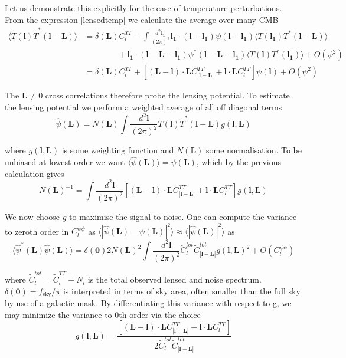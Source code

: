 \documentclass[a4paper,10pt]{article}
\renewcommand{\v}[1]{\mathbf{#1}}
\newcommand{\finttwo}[1]{\int \frac{d^2 \v{#1}}{(2\pi)^2}}
\begin{document}
Let us demonstrate this explicitly for the case of temperature perturbations. From the expression \ref{lensedtemp} we calculate the average over many CMB
\begin{equation}\begin{split}
\langle \tilde{T}(\v{l})\tilde{T}^*(\v{l}-\v{L})\rangle &= \delta(\v{L})C_l^{TT} -  \finttwo{l_1}  \v{l_1}\cdot(\v{l}-\v{l_1})\psi(\v{l}-\v{l_1}) \langle T(\v{l_1})T^*(\v{l}-\v{L})\rangle \\
&\qquad\qquad + \v{l_1}\cdot(\v{l}-\v{L}-\v{l_1})\psi^*(\v{l}-\v{L}-\v{l_1}) \langle T(\v{l})T^*(\v{l_1})\rangle + O(\psi^2) \\
&=\delta(\v{L})C_l^{TT} + [(\v{L}-\v{l})\cdot\v{L}C^{TT}_{|\v{l}-\v{L}|}+\v{l}\cdot\v{L}C_l^{TT}]\psi(\v{l}) + O(\psi^2)
\end{split}\end{equation}

The $\v{L}\neq 0 $ cross correlations therefore probe the lensing potential. To estimate the lensing potential we perform a weighted average of all off diagonal terms
\begin{equation}
\hat{\psi}(\v{L}) = N(\v{L})\finttwo{l} \tilde{T}(\v{l})\tilde{T}^*(\v{l-L})g(\v{l},\v{L})
\end{equation}

where $g(\v{l},\v{L})$ is some weighting function and $N(\v{L})$ some normalisation. To be unbiased at lowest order we want $\langle \hat{\psi}(\v{L}) \rangle = \psi(\v{L})$, which by the previous calculation gives
\begin{equation}
N(\v{L})^{-1} = \finttwo{l} [(\v{L}-\v{l})\cdot\v{L}C^{TT}_{|\v{l}-\v{L}|}+\v{l}\cdot\v{L}C_l^{TT}]g(\v{l},\v{L})
\end{equation}

We now choose $g$ to maximise the signal to noise. One can compute the variance to zeroth order in $C_l^{\psi\psi}$ as $\langle| \hat{\psi}(\v{L})-\psi(\v{L})|^2 \rangle \approx 
\langle| \hat{\psi}(\v{L})|^2 \rangle$ as
\begin{equation}
\langle\hat{\psi}^*(\v{L}) \hat{\psi}(\v{L}) \rangle = \delta(\v{0})2N(\v{L})^2\finttwo{l}\tilde{C}_l^{tot}\tilde{C}_{|\v{l}-\v{L}|}^{tot}g(\v{l},\v{L})^2 + O(C_l^{\psi\psi})
\end{equation}

where $\tilde{C}_l^{tot} = \tilde{C}_l^{TT} + N_l$ is the total observed lensed and noise spectrum. $\delta(\v{0}) = f_{\text{sky}}/\pi$ is interpreted in terms of sky area, often smaller than the full sky by use of a galactic mask. By differentiating this variance with respect to g, we may minimize the variance to 0th order via the choice
\begin{equation}
g(\v{l},\v{L}) = \frac{[(\v{L}-\v{l})\cdot\v{L}C^{TT}_{|\v{l}-\v{L}|}+\v{l}\cdot\v{L}C_l^{TT}]}{2\tilde{C}_l^{tot}\tilde{C}_{|\v{l}-\v{L}|}^{tot}}
\end{equation}
\end{document}
